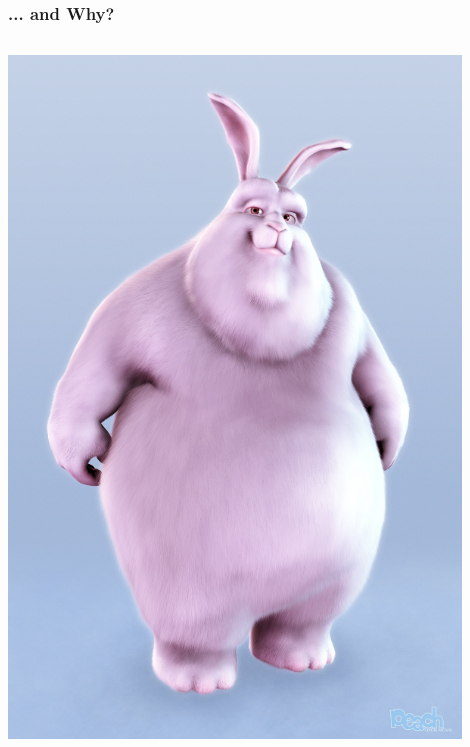 \documentclass{beamer}
\begin{document}
\begin{frame}
  \frametitle{... and Why?}
  \begin{columns}
    \includegraphics[width=0.9\textwidth]{../img/bunny-2}

\end{columns}
\end{frame}
\end{document}
